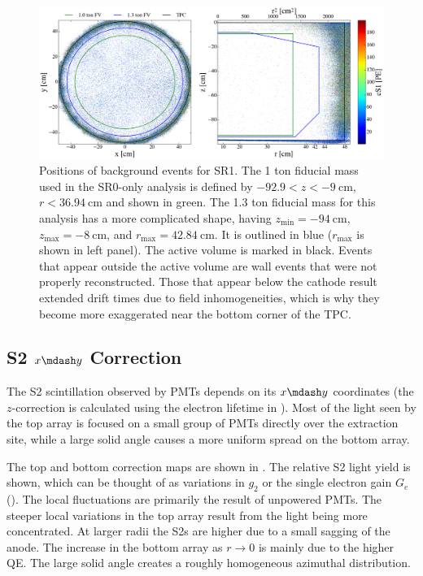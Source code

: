 \begin{figure}
\centering
\includegraphics[width=\textwidth]{FVBoth}
\caption{Positions of background events for SR1.  The 1 ton fiducial mass used in the SR0-only analysis is defined by
$-92.9 < z < -9\ \mathrm{cm}$, $r < 36.94\ \mathrm{cm}$ and shown in green.  The 1.3 ton fiducial mass for this analysis has a more
complicated shape, having $z_\mathrm{min} = -94\ \mathrm{cm}$,
$z_{\mathrm{max}} = -8\ \mathrm{cm}$, and $r_{\mathrm{max}} = 42.84\ \mathrm{cm}$.  It is outlined in blue ($r_{\mathrm{max}}$ is shown
in left panel).  The active volume is marked in black.  Events that appear outside the active volume are wall events that were not
properly
reconstructed.  Those that appear below the cathode result extended drift times due to field inhomogeneities, which is why they
become more exaggerated near the bottom corner of the TPC.}
\label{fig:calibrations_position_reconstruction}
\end{figure}



\subsection{S2 $x \mdash y$ Correction}
\label{subsec:det_char_s2_position_correction}
The S2 scintillation observed by PMTs depends on its $x \mdash y$ coordinates (the $z$-correction is calculated using the electron
lifetime in ).  Most of the light seen by the top array is focused on a small group of PMTs directly
over the extraction site, while a large
solid angle causes a more uniform spread on the bottom array.

The top and bottom correction maps are shown in .  The relative S2 light yield is shown, which can be
thought of as variations in $g_2$ or the single electron gain $G_e$ ().  The local
fluctuations are primarily the result
of unpowered PMTs.  The steeper local variations in the top array result from the light being more concentrated.  At larger radii the
S2s are higher due to a small sagging of the anode.  The increase in the bottom array as $r \rightarrow 0$ is 
mainly due to the higher QE.  The large solid angle creates a roughly homogeneous azimuthal distribution.

